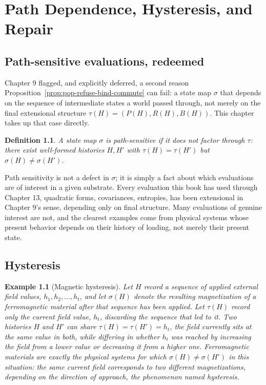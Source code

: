 \documentclass[11pt]{book}
\newtheorem{definition}[theorem]{Definition}
\newtheorem{example}[theorem]{Example}
\begin{document}
\chapter{Path Dependence, Hysteresis, and Repair}

\section{Path-sensitive evaluations, redeemed}

Chapter 9 flagged, and explicitly deferred, a second reason Proposition~\ref{prop:pop-refuse-bind-commute} can fail: a state map $\sigma$ that depends on the sequence of intermediate states a world passed through, not merely on the final extensional structure $\tau(H)=(P(H),R(H),B(H))$. This chapter takes up that case directly.

\begin{definition}
A state map $\sigma$ is \emph{path-sensitive} if it does not factor through $\tau$: there exist well-formed histories $H,H'$ with $\tau(H)=\tau(H')$ but $\sigma(H)\ne\sigma(H')$.
\end{definition}

Path sensitivity is not a defect in $\sigma$; it is simply a fact about which evaluations are of interest in a given substrate. Every evaluation this book has used through Chapter 13, quadratic forms, covariances, entropies, has been extensional in Chapter 9's sense, depending only on final structure. Many evaluations of genuine interest are not, and the clearest examples come from physical systems whose present behavior depends on their history of loading, not merely their present state.

\section{Hysteresis}

\begin{example}[Magnetic hysteresis]
\label{ex:hysteresis}
Let $H$ record a sequence of applied external field values, $h_1,h_2,\ldots,h_t$, and let $\sigma(H)$ denote the resulting magnetization of a ferromagnetic material after that sequence has been applied. Let $\tau(H)$ record only the current field value, $h_t$, discarding the sequence that led to it. Two histories $H$ and $H'$ can share $\tau(H)=\tau(H')=h_t$, the field currently sits at the same value in both, while differing in whether $h_t$ was reached by increasing the field from a lower value or decreasing it from a higher one. Ferromagnetic materials are exactly the physical systems for which $\sigma(H)\ne\sigma(H')$ in this situation: the same current field corresponds to two different magnetizations, depending on the direction of approach, the phenomenon named \emph{hysteresis}.
\end{example}
\end{document}
